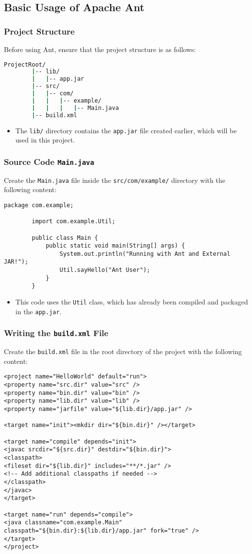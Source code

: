 \documentclass[aspectratio=169, table]{beamer}
\begin{document}
\subsection{Basic Usage of Apache Ant}

\begin{frame}[fragile]
	\frametitle{Project Structure}
	Before using Ant, ensure that the project structure is as follows:
	\begin{lstlisting}[language=bash]
		ProjectRoot/
		|-- lib/
		|   |-- app.jar
		|-- src/
		|   |-- com/
		|   |   |-- example/
		|   |   |   |-- Main.java
		|-- build.xml
	\end{lstlisting}
	\begin{itemize}
		\item The \texttt{lib/} directory contains the \texttt{app.jar} file created earlier, which will be used in this project.
	\end{itemize}
\end{frame}

\begin{frame}[fragile]
	\frametitle{Source Code \texttt{Main.java}}
	Create the \texttt{Main.java} file inside the \texttt{src/com/example/} directory with the following content:
	\begin{lstlisting}[style=JavaStyle]
		package com.example;
		
		import com.example.Util;
		
		public class Main {
			public static void main(String[] args) {
				System.out.println("Running with Ant and External JAR!");
				Util.sayHello("Ant User");
			}
		}
	\end{lstlisting}
	\begin{itemize}
		\item This code uses the \texttt{Util} class, which has already been compiled and packaged in the \texttt{app.jar}.
	\end{itemize}
\end{frame}

\begin{frame}[fragile]
	\vspace{20pt}
	\frametitle{Writing the \texttt{build.xml} File}
	Create the \texttt{build.xml} file in the root directory of the project with the following content:
	\begin{lstlisting}[style=XmlStyle]
<project name="HelloWorld" default="run">
<property name="src.dir" value="src" />
<property name="bin.dir" value="bin" />
<property name="lib.dir" value="lib" />
<property name="jarfile" value="${lib.dir}/app.jar" />

<target name="init"><mkdir dir="${bin.dir}" /></target>

<target name="compile" depends="init">
<javac srcdir="${src.dir}" destdir="${bin.dir}">
<classpath>
<fileset dir="${lib.dir}" includes="**/*.jar" />
<!-- Add additional classpaths if needed -->
</classpath>
</javac>
</target>

<target name="run" depends="compile">
<java classname="com.example.Main" classpath="${bin.dir}:${lib.dir}/app.jar" fork="true" />
</target>
</project>
	\end{lstlisting}
\end{frame}
\end{document}
